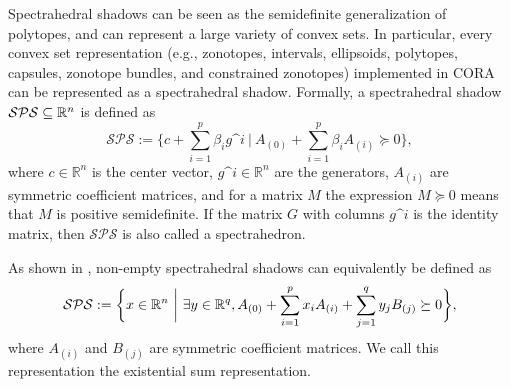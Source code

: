  \label{sec:spectraShadow}

Spectrahedral shadows can be seen as the semidefinite generalization of polytopes, and can represent a large variety of convex sets. In particular, every convex set representation (e.g., zonotopes, intervals, ellipsoids, polytopes, capsules, zonotope bundles, and constrained zonotopes) implemented in CORA can be represented as a spectrahedral shadow. Formally, a spectrahedral shadow $\mathcal{SPS} \subseteq \mathbb{R}^n$ is defined as
\begin{equation} \label{eq:spectrahedralShadow}
	\mathcal{SPS} := \bigg \{ c + \sum_{i=1}^{p} \beta_i g\^{i} ~\bigg|~ A_{(0)} + \sum_{i=1}^p \beta_i A_{(i)} \succeq 0 \bigg\},
\end{equation}
where $c \in \mathbb{R}^n$ is the center vector, $g\^i \in \mathbb{R}^n$ are the generators, $A_{(i)}$ are symmetric coefficient matrices, and for a matrix $M$ the expression $M \succeq 0$ means that $M$ is positive semidefinite. If the matrix $G$ with columns $g\^i$ is the identity matrix, then $\mathcal{SPS}$ is also called a spectrahedron.

As shown in \cite[Lemma 4.1.5.]{Netzer2011}, non-empty spectrahedral shadows can equivalently be defined as
\begin{equation} \label{eq:spectrahedralShadow_existentialSum}
	\mathcal{SPS} := \bigg \{ x \in \mathbb{R}^n ~\bigg|~ \exists y \in \mathbb{R}^q, A_{(0)} + \sum_{i=1}^p x_i A_{(i)} + \sum_{j=1}^q y_j B_{(j)} \succeq 0 \bigg\},
\end{equation}
where $A_{(i)}$ and $B_{(j)}$ are symmetric coefficient matrices. We call this representation the existential sum representation.

